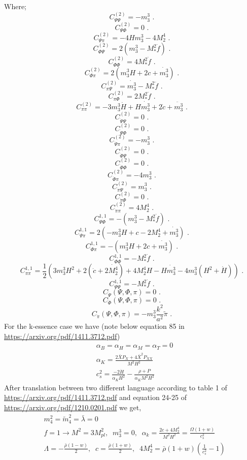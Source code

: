 \documentclass[a4paper,14pt]{article}
\newcommand {\be}{\begin{equation}}
\newcommand {\ee}{\end{equation}}
\begin{document}
Where;
\be
C^{(2)}_{\Psi \Psi}=  - m_3^3 \text{ .}
\ee
\be
C^{(2)}_{\Psi \Phi}= 0 \text{ .}
\ee
\be
C^{(2)}_{\Psi \pi}=  -4 H m_3^3 - 4 M_2^4  \text{ .}
\ee
\be
C^{(2)}_{\Phi \Psi}= 2 (m_3^3 -M_*^2 \dot{f})  \text{ .}
\ee
\be
C^{(2)}_{\Phi \Phi}= 4 M_*^2 \dot{f} \text{ .}
\ee
\be
C^{(2)}_{\Phi \pi}= 2 \left ( m_3^3 H + 2 c +\dot{m_3^3}  \right )   \text{ .}
\ee
\be
C^{(2)}_{\pi \Psi}= \dot{m_3^3} - M_*^2 \ddot{f} \text{ .}
\ee
\be
C^{(2)}_{\pi \Phi}= 2 M_*^2 \ddot{f} \text{ .}
\ee
\be
C^{(2)}_{\pi \pi}=  -3m_3^3 \dot{H} +  H \dot{m_3^3} + 2 \dot{c} +  \ddot{m_3^3}   \text{ .}
\ee
\be
C^{(2)}_{\dot{\Psi} \Psi}= 0\text{ .}
\ee
\be
C^{(2)}_{\dot{\Psi} \Phi}=0 \text{ .}
\ee
\be
C^{(2)}_{\dot{\Psi} \pi}= -m_3^3 \text{ .}
\ee
\be
C^{(2)}_{\dot{\Phi} \Psi}=0 \text{ .}
\ee
\be
C^{(2)}_{\dot{\Phi} \Phi}=0 \text{ .}
\ee
\be
C^{(2)}_{\dot{\Phi} \pi}= -4 m_3^3 \text{ .}
\ee
\be
C^{(2)}_{\dot{\pi} \Psi}= m_3^3   \text{ .}
\ee
\be
C^{(2)}_{\dot{\pi} \Phi}= 0 \text{ .}
\ee
\be
C^{(2)}_{\dot{\pi} \pi}= 4 M_2^4 \text{ .}
\ee
\be
C^{1,1}_{\Psi \Phi}= - (m_3^3 -M_*^2 \dot{f}) \text{ .}
\ee
\be
C^{1,1}_{\Psi \pi}=  2 (-m_3^3 H + c- 2 M_2^4 +\dot{m_3^3 })    \text{ .}
\ee
\be
C^{1,1}_{\Phi \pi}= - \left (  m_3^3 H + 2c + \dot{m_3^3}  \right )      \text{ .}
\ee
\be
C^{1,1}_{\Phi \Phi}=	- M_*^2 \dot{f}	\text{ .}
\ee
\be
C^{1,1}_{\pi \pi}= \frac{1}{2} \left (  3 m_3^3 H^2 + 2 (\dot{c} +2  \dot{M_2^4})+ 4 M_2^4 H - H \dot{m_3^3 }  -4 {m_3^3}  (H^2 +\dot{H}) \right )	\text{ .}
\ee
\be
C^{1,1}_{\Psi \Psi}= - M_*^2 \dot{f}	\text{ .}
\ee
\be
C_{\ddot{\Psi}} (\Psi,\Phi,\pi)=0	\text{ .}
\ee
\be
C_{\ddot{\Phi}} (\Psi,\Phi,\pi)= 0 \text{ .}
\ee
\be
C_{\ddot{\pi}} (\Psi,\Phi,\pi)= 	- m_3^3 \frac{k^2}{a^2} \tilde{\pi} \text{ .}
\ee
For the k-essence case we have (note below equation 85 in \url{https://arxiv.org/pdf/1411.3712.pdf})
\begin{align}
& \alpha_B= \alpha_H=\alpha_M=\alpha_T=0 \nonumber \\ &
\alpha_K=\frac{2\bar{X} P _X + 4 \bar{X}^2 P_{XX}}{M^2 H^2 }  \nonumber \\ &
c_s^2=\frac{-2 \dot{H}}{\alpha_K H^2 } - \frac{\rho + P}{\alpha_K M^2 H^2}
\end{align}
After translation between two different language according to table 1 of  \url{https://arxiv.org/pdf/1411.3712.pdf} and equation 24-25 of \url{https://arxiv.org/pdf/1210.0201.pdf} we get,
\begin{align}
 & m_4^2=\tilde{m}_4^2=\bar{\lambda}=0 \nonumber  \\ &
 f=1 \longrightarrow M^2=3M_{pl}^2,  \;  \;  m_3^3=0 , \;  \; \alpha_k=\frac{2c +4 M_2^4}{M^2 H^2}=  \frac{\Omega (1+w)}{c_s^2} \\ \nonumber &
 \Lambda= -\frac{\bar{\rho} (1-w)}{2}, \; \; c=\frac{\bar{\rho} (1+w)}{2}, \; \; 4 M_2^4=\bar{\rho} (1+w) (\frac{1}{c_s^2}-1)
\end{align}
\end{document}
